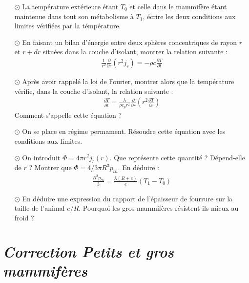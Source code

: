\documentclass{report}
\begin{document}
\begin{itemize}

	\item[$\odot$] La température extérieure étant $T_{0}$ et celle dans le mammifère étant maintenue dans tout son métabolisme à $T_1$, écrire les deux conditions aux limites vérifiées par la témpérature.
	
	\item[$\odot$] En faisant un bilan d'énergie entre deux sphères concentriques de rayon $r$ et $r+dr$ situées dans la couche d'isolant, montrer la relation suivante :
	\begin{align*}
		\frac{1}{r^2}\frac{\partial }{\partial r}\left( r^2j_r\right) =-\rho c\frac{\partial T}{\partial t}
	\end{align*}
	
	\item[$\odot$] Après avoir rappelé la loi de Fourier, montrer alors que la température vérifie, dans la couche d'isolant, la relation suivante :
	\begin{align*}
		\frac{\partial T}{\partial t}=\frac{\lambda}{\rho c_p r^2}\frac{\partial }{\partial r}\left( r^2\frac{\partial T}{\partial r}\right) 	
	\end{align*}
	Comment s'appelle cette équation ?

	\item[$\odot$] On se place en régime permament. Résoudre cette équation avec les conditions aux limites.
	
	\item[$\odot$] On introduit $\Phi=4\pi r^2j_r(r)$. Que représente cette quantité ? Dépend-elle de $r$ ? Montrer que $\Phi=4/3\pi R^3p_{th}$. En déduire :
	\begin{align*}
		\frac{R^2p_{th}}{3}=\frac{\lambda (R+e)}{e}(T_1-T_0)
	\end{align*}
	
	\item[$\odot$] En déduire une expression du rapport de l'épaisseur de fourrure sur la taille de l'animal $e/R$. Pourquoi les gros mammifères résistent-ils mieux au froid ?

\end{itemize}

\newpage

\section*{\textit{Correction Petits et gros mammifères}}
\end{document}

